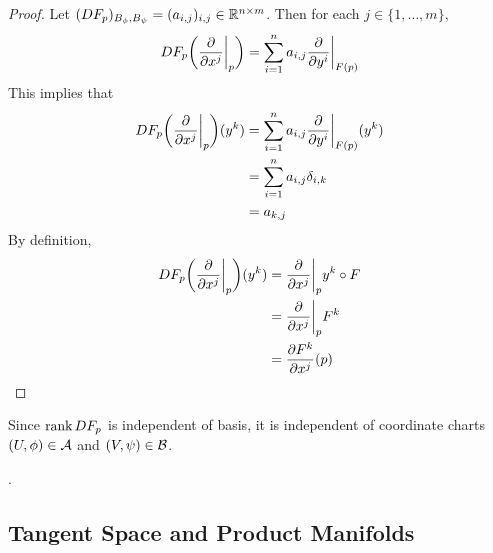\documentclass{book}
\begin{document}
	\begin{proof}
		Let $(DF_p)_{B_\phi, B_{\psi}} = (a_{i,j})_{i,j} \in \mathbb{R}^{n \times m}$. Then for each $j \in \{1, \dots, m\}$, $$DF_p \bigg(\frac{\partial }{\partial x^j} \bigg|_p\bigg) = \sum_{i=1}^n a_{i,j}\frac{\partial }{\partial y^i} \bigg|_{F(p)}$$
		This implies that 
		\begin{align*}
			DF_p \bigg(\frac{\partial }{\partial x^j} \bigg|_p\bigg) (y^k )
			&=   \sum_{i=1}^n a_{i,j}\frac{\partial }{\partial y^i} \bigg|_{F(p)} (y^k) \\
			&= \sum_{i=1}^n a_{i,j} \delta_{i,k} \\
			&= a_{k, j}
		\end{align*}
		By definition, 
		\begin{align*}
			DF_p \bigg(\frac{\partial }{\partial x^j} \bigg|_p\bigg) (y^k )
			&=  \frac{\partial }{\partial x^j} \bigg|_p y^k \circ F \\
			&= \frac{\partial }{\partial x^j} \bigg|_p F^k \\
			&= \frac{\partial F^k}{\partial x^j} (p)
		\end{align*}
	\end{proof}
	
	
	\begin{note}
	Since $\operatorname{\text{rank}} DF_p$ is independent of basis, it is independent of coordinate charts $(U, \phi) \in \mathcal{A}$ and $(V, \psi) \in \mathcal{B}$. 
	\end{note}	

	\begin{ex}
		.
	\end{ex}
	
	
	
	\begin{ex}
		
	\end{ex}

	
	\subsection{Tangent Space and Product Manifolds}
	
\end{document}
